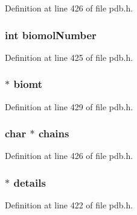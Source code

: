 Definition at line 426 of file pdb.\-h.

\hypertarget{struct__biomolecule_a84838cab5fc375053ed4a09a5b4f8cec}{
\subsubsection[{biomol\-Number}]{\setlength{\rightskip}{0pt plus 5cm}int biomol\-Number}}\label{struct__biomolecule_a84838cab5fc375053ed4a09a5b4f8cec}


Definition at line 425 of file pdb.\-h.

\hypertarget{struct__biomolecule_ac6a46f6182ce9d01b06d36ece7d5cb0f}{
\subsubsection[{biomt}]{$\ast$ biomt}}\label{struct__biomolecule_ac6a46f6182ce9d01b06d36ece7d5cb0f}


Definition at line 429 of file pdb.\-h.

\hypertarget{struct__biomolecule_a3a6f716388528a6d28884736306c5c23}{
\subsubsection[{chains}]{\setlength{\rightskip}{0pt plus 5cm}char $\ast$ chains}}\label{struct__biomolecule_a3a6f716388528a6d28884736306c5c23}


Definition at line 426 of file pdb.\-h.

\hypertarget{struct__biomolecule_a73debaf9b15b1bb04d12377b5c36a9ed}{
\subsubsection[{details}]{$\ast$ details}}\label{struct__biomolecule_a73debaf9b15b1bb04d12377b5c36a9ed}


Definition at line 422 of file pdb.\-h.

